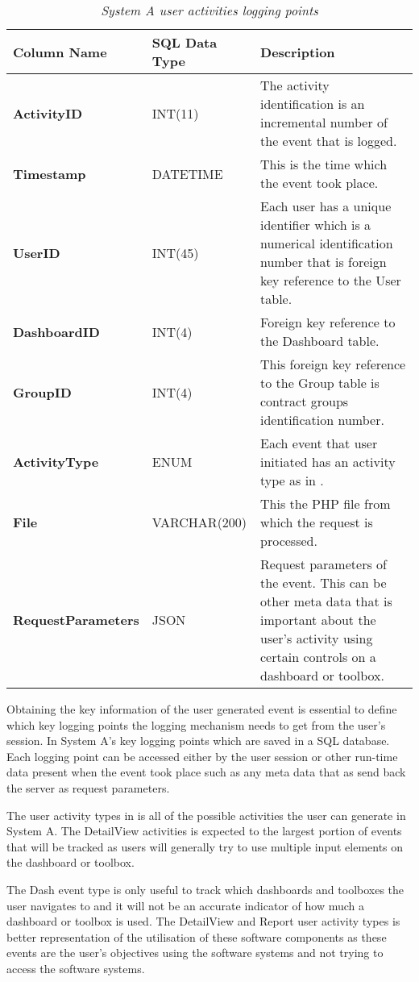 \begin{table}[!htb]
	\centering
	\small
	\caption[System A user activities logging points]
	{\textit{System A user activities logging points}}
	\label{tbl:Ch2_System_A_Logging_Points}
	\begin{tabularx}{\textwidth}{|l|l|X|}
		\hline \textbf{Column Name} & \textbf{SQL Data Type} & \textbf{Description} \\
		\hline \textbf{ActivityID} & INT(11) & The activity identification is an incremental number of the event that is logged.\\
		\hline \textbf{Timestamp} & DATETIME & This is the time which the event took place.\\
		\hline \textbf{UserID} & INT(45) & Each user has a unique identifier which is a numerical identification number that is foreign key reference to the User table.\\
		\hline \textbf{DashboardID} & INT(4) & Foreign key reference to the Dashboard table. \\
		\hline \textbf{GroupID} & INT(4) & This foreign key reference to the Group table is contract groups identification number. \\ 		
		\hline \textbf{ActivityType} & ENUM & Each event that user initiated has an activity type as in \Cref{tbl:Ch2_SystemA_EventTypes}. \\
		\hline \textbf{File} & VARCHAR(200) & This the PHP file from which the request is processed.\\
		\hline \textbf{RequestParameters} & JSON & Request parameters of the event. This can be other meta data that is important about the user's activity using certain controls on a dashboard or toolbox. \\
		\hline
	\end{tabularx}
\end{table}

\clearpage

Obtaining the key information of the user generated event is essential to define which key logging points the logging mechanism needs to get from the user's session. In  System A's key logging points which are saved in a SQL database. Each logging point can be accessed either by the user session or other run-time data present when the event took place such as any meta data that as send back the server as request parameters.

The user activity types in  is all of the possible activities the user can generate in System A. The DetailView activities is expected to the largest portion of events that will be tracked as users will generally try to use multiple input elements on the dashboard or toolbox. \par The Dash event type is only useful to track which dashboards and toolboxes the user navigates to and it will not be an accurate indicator of how much a dashboard or toolbox is used. The DetailView and Report user activity types is better representation of the utilisation of these software components as these events are the user's objectives using the software systems and not trying to access the software systems.  


